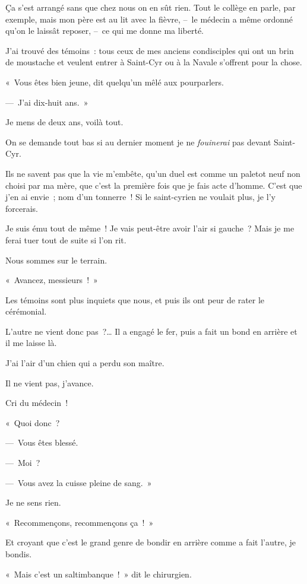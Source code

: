 \documentclass[french,twoside]{book} %
\begin{document}
\noindent Ça s’est arrangé sans que chez nous on en sût rien. Tout le collège en parle, par exemple, mais mon père est au lit avec la fièvre, – le médecin a même ordonné qu’on le laissât reposer, – ce qui me donne ma liberté.\par
J’ai trouvé des témoins : tous ceux de mes anciens condisciples qui ont un brin de moustache et veulent entrer à Saint-Cyr ou à la Navale s’offrent pour la chose.\par
« Vous êtes bien jeune, dit quelqu’un mêlé aux pourparlers.\par
— J’ai dix-huit ans. »\par
Je mens de deux ans, voilà tout.\par
On se demande tout bas si au dernier moment je ne \emph{fouinerai} pas devant Saint-Cyr.\par
Ils ne savent pas que la vie m’embête, qu’un duel est comme un paletot neuf non choisi par ma mère, que c’est la première fois que je fais acte d’homme. C’est que j’en ai envie ; nom d’un tonnerre ! Si le saint-cyrien ne voulait plus, je l’y forcerais.\par
Je suis ému tout de même ! Je vais peut-être avoir l’air si gauche ? Mais je me ferai tuer tout de suite si l’on rit.\par
\bigbreak
\noindent Nous sommes sur le terrain.\par
« Avancez, messieurs ! »\par
Les témoins sont plus inquiets que nous, et puis ils ont peur de rater le cérémonial.\par
L’autre ne vient donc pas ?… Il a engagé le fer, puis a fait un bond en arrière et il me laisse là.\par
J’ai l’air d’un chien qui a perdu son maître.\par
Il ne vient pas, j’avance.\par
Cri du médecin !\par
« Quoi donc ?\par
— Vous êtes blessé.\par
— Moi ?\par
— Vous avez la cuisse pleine de sang. »\par
Je ne sens rien.\par
« Recommençons, recommençons ça ! »\par
Et croyant que c’est le grand genre de bondir en arrière comme a fait l’autre, je bondis.\par
« Mais c’est un saltimbanque ! » dit le chirurgien.\par
\end{document}
